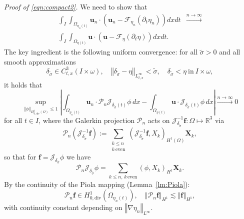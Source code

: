 \documentclass[10pt,a4paper]{article}
\numberwithin{equation}{section}
\begin{document}
\noindent\textit{Proof of \eqref{eqn:compact2}.}
We need to show that
\begin{equation}\label{eqn:compact2}
\begin{aligned}\int_{I}\int_{\Omega_{\eta_{n}\left(t\right)}}\mathbf{u}_{n}\cdot\left(\mathbf{u}_{n}-\mathcal{F}_{\eta_{n}}\left(\partial_{t}\eta_{n}\right)\right)dxdt & \xrightarrow{n\to\infty}\\
\int_{I}\int_{\Omega_{\eta\left(t\right)}}\mathbf{u}\cdot\left(\mathbf{u}-\mathcal{F}_{\eta}\left(\partial_{t}\eta\right)\right)dxdt.
\end{aligned}
\end{equation}
The key ingredient is the following uniform convergence: for all $\tilde{\sigma}>0$ and all smooth approximations
\[
\delta_{\tilde{\sigma}}\in C_{t,x}^{3}\left(I\times\omega\right),\quad\left\Vert \delta_{\tilde{\sigma}}-\eta\right\Vert _{L_{t,x}^{\infty}}<\tilde{\sigma},\quad\delta_{\tilde{\sigma}}<\eta\ \text{in}\ I\times\omega,
\]
it holds that
\begin{equation}\label{eqn:uniform-conv-h1-piola}
\sup_{\left\Vert \phi\right\Vert _{H_{0,\text{div}}^{1}\left(\Omega\right)}\le1}\left|\int_{\Omega_{\eta_{n}\left(t\right)}}\mathbf{u}_{n}\cdot\mathcal{P}_{n}\mathcal{J}_{\delta_{\tilde{\sigma}}\left(t\right)}\phi\, dx-\int_{\Omega_{\eta\left(t\right)}}\mathbf{u}\cdot\mathcal{J}_{\delta_{\tilde{\sigma}}\left(t\right)}\phi\, dx\right|\xrightarrow{n\to\infty}0
\end{equation}
for all $t\in I$, where the Galerkin projection $\mathcal{P}_n$ acts on $\mathcal{J}_{\delta_{\tilde\sigma}}^{-1}\mathbf{f}:\Omega\mapsto\mathbb{R}^3$ via
\begin{equation*}
\mathcal{P}_{n}\left(\mathcal{J}_{\delta_{\tilde{\sigma}}}^{-1}\mathbf{f}\right):=\sum_{\substack{k\le n \\ k\ \text{even}}}\left(\mathcal{J}_{\delta_{\tilde{\sigma}}}^{-1}\mathbf{f},X_{k}\right)_{H^{1}\left(\Omega\right)}\mathbf{X}_{k},
\end{equation*}
so that for $\mathbf{f}=\mathcal{J}_{\delta_{\tilde{\sigma}}}\phi$ we have \[\mathcal{P}_{n}\mathcal{J}_{\delta_{\tilde{\sigma}}}\phi=\sum_{k\le n,\,k\,\text{even}}\left(\phi,X_{k}\right)_{H^{1}}\mathbf{X}_{k}.
\]
By the continuity of the Piola mapping (Lemma~\ref{lm:Piola}):
\[
\mathcal{P}_{n}\mathbf{f}\in H_{0,\text{div}}^{1}\left(\Omega_{\eta_{n}\left(t\right)}\right),\quad\left\Vert \mathcal{P}_{n}\mathbf{f}\right\Vert _{H^{1}}\lesssim\left\Vert \mathbf{f}\right\Vert _{H^{1}},
\]
with continuity constant depending on $\left\Vert \nabla\eta_{n}\right\Vert _{L^{\infty}}$.
\end{document}
